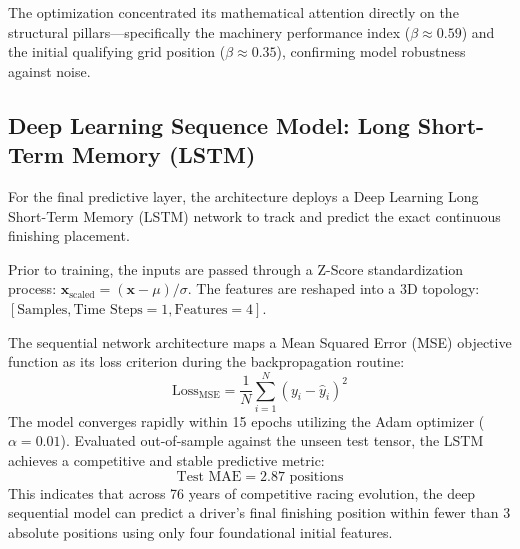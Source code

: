 The optimization concentrated its mathematical attention directly on the structural pillars—specifically the machinery performance index ($\beta \approx 0.59$) and the initial qualifying grid position ($\beta \approx 0.35$), confirming model robustness against noise.

\subsection{Deep Learning Sequence Model: Long Short-Term Memory (LSTM)}
\label{subsec:lstm_dl}

For the final predictive layer, the architecture deploys a Deep Learning Long Short-Term Memory (LSTM) network to track and predict the exact continuous finishing placement.

\noindent Prior to training, the inputs are passed through a Z-Score standardization process: $\mathbf{x}_{\text{scaled}} = (\mathbf{x} - \mu) / \sigma$. The features are reshaped into a 3D topology: $[\text{Samples}, \text{Time Steps} = 1, \text{Features} = 4]$. 

The sequential network architecture maps a Mean Squared Error (MSE) objective function as its loss criterion during the backpropagation routine:
\begin{equation}
\text{Loss}_{\text{MSE}} = \frac{1}{N} \sum_{i=1}^{N} (y_i - \hat{y}_i)^2
\end{equation}
The model converges rapidly within 15 epochs utilizing the Adam optimizer ($\alpha = 0.01$). Evaluated out-of-sample against the unseen test tensor, the LSTM achieves a competitive and stable predictive metric:
\begin{equation}
\text{Test MAE} = 2.87 \text{ positions}
\end{equation}
This indicates that across 76 years of competitive racing evolution, the deep sequential model can predict a driver's final finishing position within fewer than 3 absolute positions using only four foundational initial features.